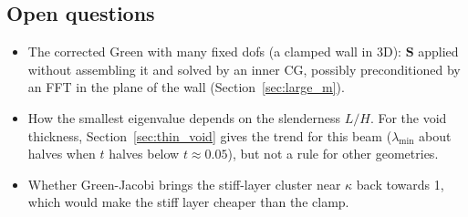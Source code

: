 \documentclass[11pt,a4paper]{article}
\begin{document}
\subsection*{Open questions}
\begin{itemize}
  \item The corrected Green with many fixed dofs (a clamped wall in 3D): $\mathbf{S}$ applied without assembling it
        and solved by an inner CG, possibly preconditioned by an FFT in the plane of the wall
        (Section~\ref{sec:large_m}).
  \item How the smallest eigenvalue depends on the slenderness $L/H$. For the void thickness, Section~\ref{sec:thin_void}
        gives the trend for this beam ($\lambda_{\min}$ about halves when $t$ halves below $t \approx 0.05$), but not a
        rule for other geometries.
  \item Whether Green-Jacobi brings the stiff-layer cluster near $\kappa$ back towards 1, which would make the stiff
        layer cheaper than the clamp.
\end{itemize}
\end{document}
